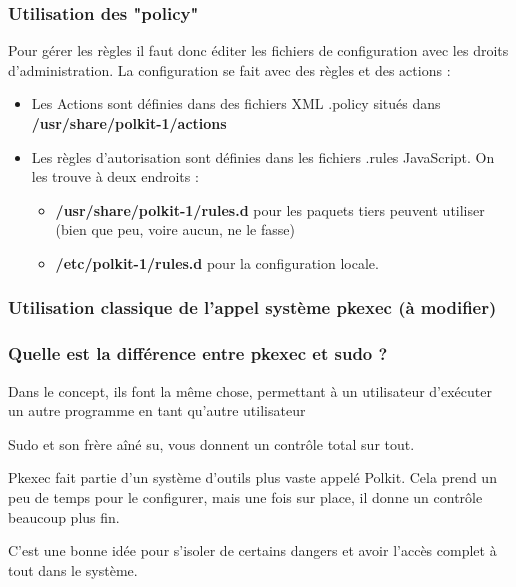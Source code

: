 \documentclass[a4paper, 12pt]{article}
\begin{document}
\begin{flushleft}
\begin{flushleft}
                \subsubsection{Utilisation des "policy"}
                \begin{flushleft}
                    \noindent Pour gérer les règles il faut donc éditer les fichiers de configuration avec les droits d'administration. La configuration se fait avec des règles et des actions :
                    \begin{itemize}
                        \item Les Actions sont définies dans des fichiers XML .policy situés dans \textbf{/usr/share/polkit-1/actions} 
                        \item Les règles d'autorisation sont définies dans les fichiers .rules JavaScript. On les trouve à deux endroits : \cite{PartVMan11:online}
                        \begin{itemize}
                            \item \textbf{/usr/share/polkit-1/rules.d} pour les paquets tiers peuvent utiliser (bien que peu, voire aucun, ne le fasse)
                            \item \textbf{/etc/polkit-1/rules.d} pour la configuration locale.
                        \end{itemize}
                    \end{itemize}
                \end{flushleft}
                \subsubsection{Utilisation classique de l'appel système pkexec (à modifier)}
                \subsubsection{Quelle est la différence entre pkexec et sudo ?}
                \begin{flushleft}
                    \noindent Dans le concept, ils font la même chose, permettant à un utilisateur d'exécuter un autre programme en tant qu'autre utilisateur
                    \item Sudo et son frère aîné su, vous donnent un contrôle total sur tout.
                    \item Pkexec fait partie d'un système d'outils plus vaste appelé Polkit. Cela prend un peu de temps pour le configurer, mais une fois sur place, il donne un contrôle beaucoup plus fin.
                    \item C'est une bonne idée pour s'isoler de certains dangers et avoir l'accès complet à tout dans le système.
                \end{flushleft}
            
            \end{flushleft}
   		\end{flushleft}
\end{document}
